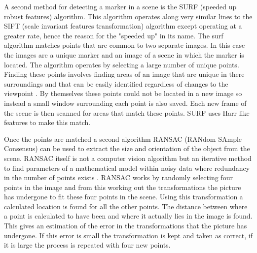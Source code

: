 A second method for detecting a marker in a scene is the SURF (speeded up robust features) algorithm. This algorithm operates along very similar lines to the SIFT (scale invariant features transformation) algorithm except operating at a greater rate, hence the reason for the "speeded up" in its name. The surf algorithm matches points that are common to two separate images. In this case the images are a unique marker and an image of a scene in which the marker is located. The algorithm operates by selecting a large number of unique points. Finding these points involves finding areas of an image that are unique in there surroundings and that can be easily identified regardless of changes to the viewpoint \cite{surf}. By themselves these points could not be located in a new image so instead a small window surrounding each point is also saved. Each new frame of the scene is then scanned for areas that match these points. SURF uses Harr like features to make this match.

Once the points are matched a second algorithm RANSAC (RANdom SAmple Consensus) can be used to extract the size and orientation of the object from the scene. RANSAC itself is not a computer vision algorithm but an iterative method to find parameters of a mathematical model within noisy data where redundancy in the number of points exists \cite{cosc428}. RANSAC works by randomly selecting four points in the image and from this working out the transformations the picture has undergone to fit these four points in the scene. Using this transformation a calculated location is found for all the other points. The distance between where a point is calculated to have been and where it actually lies in the image is found. This gives an estimation of the error in the transformations that the picture has undergone. If this error is small the transformation is kept and taken as correct, if it is large the process is repeated with four new points.